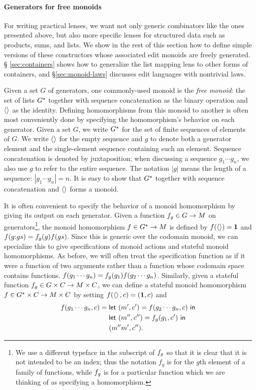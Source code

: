 \paragraph*{Generators for free monoids}
For writing practical lenses, we want not only generic combinators like the
ones presented above, but also more specific lenses for structured data
such as products, sums, and lists.
%
We show in the rest of this section how to define simple versions of these
constructors whose associated edit monoids are freely generated.  \S
\ref{sec:containers} shows how to generalize the list mapping lens to other
forms of containers, and \S \ref{sec:monoid-laws} discusses edit languages
with nontrivial laws.

\ifdissertation
Given a set $G$ of generators, one commonly-used monoid is the \emph{free
monoid}: the set of lists $G^\star$ together with sequence concatenation as
the binary operation and $\left<\right>$ as the identity.  Defining homomorphisms
from this monoid to another is often most conveniently done by specifying
the homomorphism's behavior on each generator.
\else
Given a set $G$, we write $G^\star$ for the set of finite sequences of
elements of $G$. We write $\left<\right>$ for the empty
sequence and $g$ to denote both a generator element 
and the single-element sequence containing such an element. 
Sequence concatenation is denoted by juxtaposition; when discussing a sequence
$g_1 \cdots g_n$, we also use $g$ to refer to the entire sequence. The
notation $|g|$ means the length of a sequence: $|g_1 \cdots g_n|=n$. It
is easy to show that $G^\star$ together with sequence concatenation and
$\left<\right>$ forms a monoid.

It is often convenient to specify the behavior of a monoid
homomorphism by giving its output on each generator.
\fi
Given a function $f_g \in G \to M$ on
generators\ifdissertation\footnote{We use a different typeface in the
    subscript of $f_g$ so that it is clear that it is not intended to be
    an index; thus the notation $f_g$ is for the $g$th element of a family
    of functions, while $f_g$ is for a particular function which we are
    thinking of as specifying a homomorphism.}\fi, the monoid homomorphism $f
\in G^\star \to M$ is defined by $f(\left<\right>)=\mbox{\bf{1}}$ and
\ifdissertation
$f(g \mathord{:} gs)=f_g(g)f(gs)$. Since this is generic over the codomain
monoid, we can specialize this to give specifications of monoid actions and
stateful monoid homomorphisms. As before, we will often treat the
specification function as if it were a function of two arguments rather than
a function whose codomain space contains functions.
\else
$f(g_1 \cdots g_n)=f_g(g_1)f(g_2 \cdots g_n)$. Similarly, given a
stateful function $f_g \in G \times C \to M \times C$, we can define a
stateful monoid homomorphism $f \in G^\star \times C \to M \times C$ by setting
$f(\left<\right>,c) = (\mbox{\bf{1}},c)$ and
\begin{align*}
    f(g_1 \cdots g_n,c) ={}& \mathsf{let}\  (m',c') = f(g_2 \cdots g_n,c) \ \mathsf{in} \\
    & \mathsf{let}\  (m'',c'') = f_g(g_1,c') \ \mathsf{in} \\
    & (m''m',c'')
.
\end{align*}
\fi

